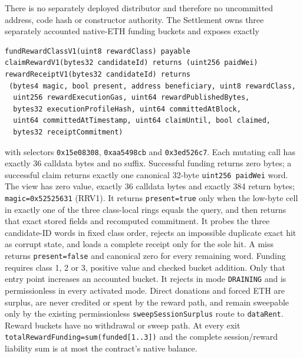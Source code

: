 \documentclass[a4paper,11pt]{article}
\newcommand{\code}[1]{\nolinkurl{#1}}
\begin{document}
There is no separately deployed distributor and therefore no uncommitted
address, code hash or constructor authority.  The Settlement owns
three separately accounted native-ETH funding buckets and exposes exactly
\begin{verbatim}
fundRewardClassV1(uint8 rewardClass) payable
claimRewardV1(bytes32 candidateId) returns (uint256 paidWei)
rewardReceiptV1(bytes32 candidateId) returns
 (bytes4 magic, bool present, address beneficiary, uint8 rewardClass,
  uint256 rewardExecutionGas, uint64 rewardPublishedBytes,
  bytes32 executionProfileHash, uint64 committedAtBlock,
  uint64 committedAtTimestamp, uint64 claimUntil, bool claimed,
  bytes32 receiptCommitment)
\end{verbatim}
with selectors \code{0x15e08308}, \code{0xaa5498cb} and \code{0x3ed526c7}.
Each mutating call has exactly 36 calldata bytes and no suffix.  Successful
funding returns zero bytes; a successful claim returns exactly one canonical
32-byte \code{uint256 paidWei} word.
The view has zero value, exactly 36 calldata bytes and exactly 384 return bytes;
\code{magic=0x52525631} (RRV1).  It returns \code{present=true} only when the
low-byte cell in exactly one of the three class-local rings equals the query,
and then returns that exact stored fields and recomputed commitment.  It probes
the three candidate-ID words in fixed class order, rejects an impossible
duplicate exact hit as corrupt state, and loads a complete receipt only for the
sole hit.  A miss returns \code{present=false} and canonical zero for every
remaining word.  Funding requires class
1, 2 or 3, positive value and checked bucket addition.  Only that entry point
increases an accounted bucket.  It rejects in mode \code{DRAINING} and is
permissionless in every activated mode.  Direct donations and forced ETH are surplus,
are never credited or spent by the reward path, and remain sweepable only by
the existing permissionless \code{sweepSessionSurplus} route to
\code{dataRent}.  Reward buckets have no withdrawal or sweep path.  At every
exit \code{totalRewardFunding=sum(funded[1..3])} and the complete
session/reward liability sum is at most the contract's native balance.
\end{document}
